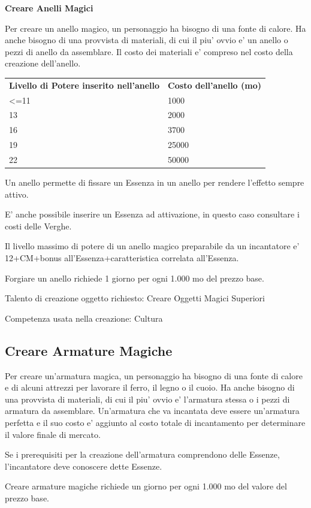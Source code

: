 \documentclass[a4paper,11pt,twoside,openany]{book}
\begin{document}
\textbf{Creare Anelli Magici}

Per creare un anello magico, un personaggio ha bisogno di una fonte di calore. Ha anche bisogno di una provvista di materiali, di cui il piu' ovvio e' un anello o pezzi di anello da assemblare. Il costo dei materiali e' compreso nel costo della creazione dell'anello.

\bigskip

\begin{tabular}{ll}
\toprule
\textbf{Livello di Potere inserito nell'anello} & \textbf{Costo dell'anello (mo)}\tabularnewline
\textless=11 & 1000\tabularnewline
13 & 2000\tabularnewline
16 & 3700\tabularnewline
19 & 25000\tabularnewline
22 & 50000\tabularnewline
\end{tabular}

\bigskip

Un anello permette di fissare un Essenza in un anello per rendere l'effetto sempre attivo.

E' anche possibile inserire un Essenza ad attivazione, in questo caso consultare i costi delle Verghe.

Il livello massimo di potere di un anello magico preparabile da un incantatore e' 12+CM+bonus all'Essenza+caratteristica correlata all'Essenza.

Forgiare un anello richiede 1 giorno per ogni 1.000 mo del prezzo base.

Talento di creazione oggetto richiesto: Creare Oggetti Magici Superiori

Competenza usata nella creazione: Cultura

\subsection{Creare Armature Magiche}

Per creare un'armatura magica, un personaggio ha bisogno di una fonte di calore e di alcuni attrezzi per lavorare il ferro, il legno o il cuoio. Ha anche bisogno di una provvista di materiali, di cui il piu' ovvio e' l'armatura stessa o i pezzi di armatura da assemblare. Un'armatura che va incantata deve essere un'armatura perfetta e il suo costo e' aggiunto al costo totale di incantamento per determinare il valore finale di mercato.

Se i prerequisiti per la creazione dell'armatura comprendono delle Essenze, l'incantatore deve conoscere dette Essenze. 

Creare armature magiche richiede un giorno per ogni 1.000 mo del valore
del prezzo base.
\end{document}
